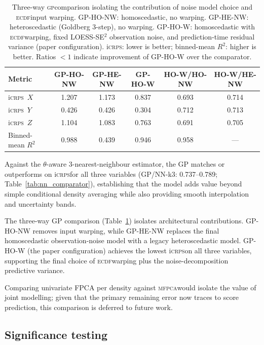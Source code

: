 \documentclass[12pt,a4paper]{article}
\newcommand{\GP}{\textsc{gp}}
\newcommand{\MFPCA}{\textsc{mfpca}}
\newcommand{\iCRPS}{i\textsc{crps}}
\newcommand{\ECDF}{\textsc{ecdf}}
\newcommand{\spar}{\theta}
\begin{document}
\begin{table}[htbp]
  \centering
  \caption{Three-way \GP comparison isolating the contribution of
           noise model choice and \ECDF input warping.
           GP-HO-NW: homoscedastic, no warping.
           GP-HE-NW: heteroscedastic (Goldberg 3-step), no warping.
           GP-HO-W: homoscedastic with \ECDF warping, fixed LOESS-SE$^2$
           observation noise, and prediction-time residual variance
           (paper configuration).
           \iCRPS: lower is better; binned-mean $R^2$: higher is better.
           Ratios $<1$ indicate improvement of GP-HO-W over the comparator.}
  \label{tab:gp_comparison}
  \setlength{\tabcolsep}{4pt}
  \begin{tabular}{lccccc}
    \toprule
    Metric & GP-HO-NW & GP-HE-NW & GP-HO-W & HO-W/HO-NW & HO-W/HE-NW \\
    \midrule
    \iCRPS\ $X$          & 1.207 & 1.173 & 0.837 & 0.693 & 0.714 \\
    \iCRPS\ $Y$          & 0.426 & 0.426 & 0.304 & 0.712 & 0.713 \\
    \iCRPS\ $Z$          & 1.104 & 1.083 & 0.763 & 0.691 & 0.705 \\
    Binned-mean $R^2$    & 0.988 & 0.439 & 0.946 & 0.958 & --- \\
    \bottomrule
  \end{tabular}
\end{table}

Against the $\spar$-aware 3-nearest-neighbour estimator, the GP
matches or outperforms on \iCRPS for all three variables
(GP/NN-k3: 0.737--0.789; Table~\ref{tab:nn_comparator}), establishing
that the model adds value beyond simple conditional density averaging
while also providing smooth interpolation and uncertainty bands.

The three-way GP comparison (Table~\ref{tab:gp_comparison}) isolates
architectural contributions.  GP-HO-NW removes input warping, while
GP-HE-NW replaces the final homoscedastic observation-noise model with a legacy
heteroscedastic model.  GP-HO-W (the paper configuration) achieves the
lowest \iCRPS on all three variables, supporting the final choice of
\ECDF warping plus the noise-decomposition predictive variance.

Comparing univariate FPCA per density against \MFPCA would isolate
the value of joint modelling; given that the primary remaining error
now traces to score prediction, this comparison is deferred to future
work.

\subsection{Significance testing}
\label{sec:stat_conf}
\end{document}
